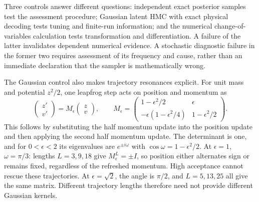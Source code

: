 Three controls answer different questions: independent exact posterior samples
test the assessment procedure; Gaussian latent HMC with exact physical decoding
tests tuning and finite-run information; and the numerical change-of-variables
calculation tests transformation and differentiation. A failure of the latter
invalidates dependent numerical evidence. A stochastic diagnostic failure in
the former two requires assessment of its frequency and cause, rather than
an immediate declaration that the sampler is mathematically wrong.

The Gaussian control also makes trajectory resonances explicit. For unit
mass and potential $z^2/2$, one leapfrog step acts on position and momentum as
\begin{equation}
 \begin{pmatrix}z'\\v'\end{pmatrix}
 =M_\epsilon\begin{pmatrix}z\\v\end{pmatrix},\qquad
 M_\epsilon=
 \begin{pmatrix}
 1-\epsilon^2/2&\epsilon\\
 -\epsilon(1-\epsilon^2/4)&1-\epsilon^2/2
 \end{pmatrix}.
 \label{eq:controlled-gaussian-leapfrog}
\end{equation}
This follows by substituting the half momentum update into the position
update and then applying the second half momentum update. The determinant is
one, and for $0<\epsilon<2$ its eigenvalues are $e^{\pm i\omega}$ with
$\cos\omega=1-\epsilon^2/2$. At $\epsilon=1$, $\omega=\pi/3$:
lengths $L=3,9,18$ give $M_\epsilon^L=\pm I$, so position either alternates
sign or remains fixed, regardless of the refreshed momentum. High acceptance
cannot rescue these trajectories. At $\epsilon=\sqrt2$, the angle is
$\pi/2$, and $L=5,13,25$ all give the same matrix. Different trajectory
lengths therefore need not provide different Gaussian kernels.

